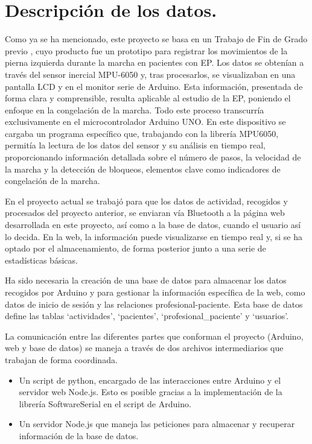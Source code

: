 
\section{Descripción de los datos.}

Como ya se ha mencionado, este proyecto se basa en un Trabajo de Fin de Grado previo \cite{saragonz91:online}, cuyo producto fue un prototipo para registrar los movimientos de la pierna izquierda durante la marcha en pacientes con EP. Los datos se obtenían a través del sensor inercial MPU-6050 y, tras procesarlos, se visualizaban en una pantalla LCD y en el monitor serie de Arduino. Esta información, presentada de forma clara y comprensible, resulta aplicable al estudio de la EP, poniendo el enfoque en la congelación de la marcha. Todo este proceso transcurría exclusivamente en el microcontrolador Arduino UNO. En este dispositivo se cargaba un programa específico que, trabajando con la librería MPU6050, permitía la lectura de los datos del sensor y su análisis en tiempo real, proporcionando información detallada sobre el número de pasos, la velocidad de la marcha y la detección de bloqueos, elementos clave como indicadores de congelación de la marcha.

En el proyecto actual se trabajó para que los datos de actividad, recogidos y procesados del proyecto anterior, se enviaran vía Bluetooth a la página web desarrollada en este proyecto, así como a la base de datos, cuando el usuario así lo decida. En la web, la información puede visualizarse en tiempo real y, si se ha optado por el almacenamiento, de forma posterior junto a una serie de estadísticas básicas.

Ha sido necesaria la creación de una base de datos para almacenar los datos recogidos por Arduino y para gestionar la información específica de la web, como datos de inicio de sesión y las relaciones profesional-paciente. Esta base de datos define las tablas `actividades', `pacientes', `profesional\_paciente' y `usuarios'.

La comunicación entre las diferentes partes que conforman el proyecto (Arduino, web y base de datos) se maneja a través de dos archivos intermediarios que trabajan de forma coordinada. 
\begin{itemize}
    \item Un script de python, encargado de las interacciones entre Arduino y el servidor web Node.js. Esto es posible gracias a la implementación de la librería SoftwareSerial en el script de Arduino.
    \item Un servidor Node.js que maneja las peticiones para almacenar y recuperar información de la base de datos.
\end{itemize}


